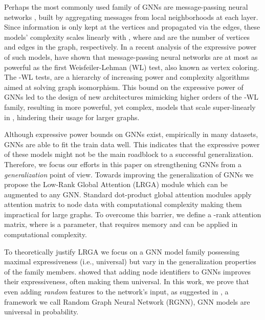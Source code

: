 \documentclass{article} \usepackage{iclr2021_conference,times}
\newcommand{\ie}{{i.e.}}
\begin{document}
Perhaps the most commonly used family of GNNs are message-passing neural networks \citep{Gilmer2017}, built by aggregating messages from local neighborhoods at each layer. Since information is only kept at the vertices and propagated via the edges, these models' complexity scales linearly with , where  and  are the number of vertices and edges in the graph, respectively. In a recent analysis of the expressive power of such models, \citep{xu2018how,morris2018weisfeiler} have shown that message-passing neural networks are at most as powerful as the first Weisfeiler-Lehman (WL) test, also known as vertex coloring. The -WL tests, are a hierarchy of increasing power and complexity algorithms aimed at solving graph isomorphism. This bound on the expressive power of GNNs led to the design of new architectures \citep{morris2018weisfeiler,maron2019provably} mimicking higher orders of the -WL family, resulting in more powerful, yet complex, models that scale super-linearly in , hindering their usage for larger graphs.  


Although expressive power bounds on GNNs exist, empirically in many datasets, GNNs are able to fit the train data well. This indicates that the expressive power of these models might not be the main roadblock to a successful generalization. Therefore, we focus our efforts in this paper on strengthening GNNs from a \emph{generalization} point of view. 
Towards improving the generalization of GNNs we propose the Low-Rank Global Attention (LRGA) module which can be augmented to any GNN. Standard dot-product global attention modules \citep{vaswani2017attention} apply  attention matrix to node data with  computational complexity making them impractical for large graphs. To overcome this barrier, we define a -rank attention matrix, where  is a parameter, that requires  memory and can be applied in  computational complexity.


To theoretically justify LRGA we focus on a GNN model family possessing maximal expressiveness (\ie, universal) but vary in the generalization properties of the family members. 
\citep{murphy2019relational,loukas2019graph, dasoulas2019coloring, loukas2020hard} showed that adding node identifiers to GNNs improves their expressiveness, often making them universal. In this work, we prove that even adding \emph{random} features to the network's input, as suggested in \citep{sato2020random}, a framework we call Random Graph Neural Network (RGNN), GNN models are universal in probability. 
\end{document}
